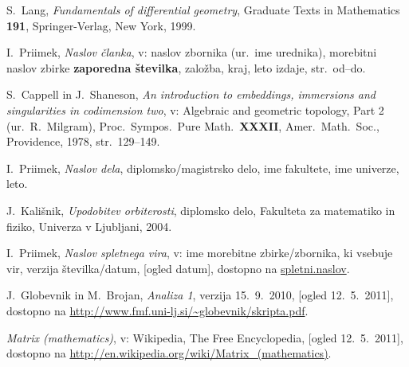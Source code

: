 \documentclass[mat1]{fmfdelo}
\newcommand{\0}{\underline{0}}
\begin{document}
\begin{thebibliography}{99}
S.~Lang, \emph{Fundamentals of differential geometry}, Graduate Texts in Mathematics \textbf{191}, Springer-Verlag, New York, 1999.

I.~Priimek, \emph{Naslov članka}, v: naslov zbornika (ur.\ ime urednika), morebitni naslov zbirke  \textbf{zaporedna številka}, založba, kraj, leto izdaje, str.\ od--do.

S.~Cappell in J.~Shaneson, \emph{An introduction to embeddings, immersions and singularities in codimension two}, v: Algebraic and geometric topology, Part 2 (ur.\ R.~Milgram), Proc.\ Sympos.\ Pure Math.\ \textbf{XXXII}, Amer.\ Math.\ Soc., Providence, 1978, str.\ 129--149.

I.~Priimek, \emph{Naslov dela}, diplomsko/magistrsko delo, ime fakultete, ime univerze, leto.

J.~Kališnik, \emph{Upodobitev orbiterosti}, diplomsko delo, Fakulteta za matematiko in fiziko, Univerza v Ljubljani, 2004.

I.~Priimek, \emph{Naslov spletnega vira}, v: ime morebitne zbirke/zbornika, ki vsebuje vir, verzija številka/datum, [ogled datum], dostopno na \url{spletni.naslov}.

J.~Globevnik in M.~Brojan, \emph{Analiza 1}, verzija 15.~9.~2010, [ogled 12.~5.~2011], dostopno na \url{http://www.fmf.uni-lj.si/~globevnik/skripta.pdf}.

\emph{Matrix (mathematics)}, v: Wikipedia, The Free Encyclopedia, [ogled 12.~5.~2011], dostopno na \url{http://en.wikipedia.org/wiki/Matrix_(mathematics)}.

\end{thebibliography}
\end{document}
